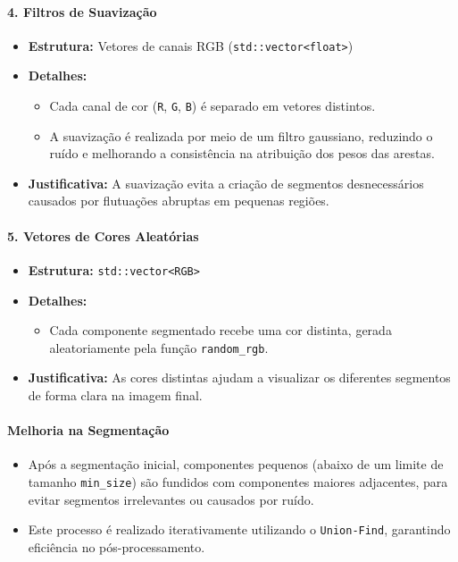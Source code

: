 \documentclass[12pt]{article}
\begin{document}
\paragraph*{\textbf{4. Filtros de Suavização}}
\begin{itemize}
    \item \textbf{Estrutura:} Vetores de canais RGB (\texttt{std::vector<float>})
    \item \textbf{Detalhes:}
    \begin{itemize}
        \item Cada canal de cor (\texttt{R}, \texttt{G}, \texttt{B}) é separado em vetores distintos.
        \item A suavização é realizada por meio de um filtro gaussiano, reduzindo o ruído e melhorando a consistência na atribuição dos pesos das arestas.
    \end{itemize}
    \item \textbf{Justificativa:} A suavização evita a criação de segmentos desnecessários causados por flutuações abruptas em pequenas regiões.
\end{itemize}

\paragraph*{\textbf{5. Vetores de Cores Aleatórias}}
\begin{itemize}
    \item \textbf{Estrutura:} \texttt{std::vector<RGB>}
    \item \textbf{Detalhes:}
    \begin{itemize}
        \item Cada componente segmentado recebe uma cor distinta, gerada aleatoriamente pela função \texttt{random\_rgb}.
    \end{itemize}
    \item \textbf{Justificativa:} As cores distintas ajudam a visualizar os diferentes segmentos de forma clara na imagem final.
\end{itemize}

\paragraph*{\textbf{Melhoria na Segmentação}}
\begin{itemize}
    \item Após a segmentação inicial, componentes pequenos (abaixo de um limite de tamanho \texttt{min\_size}) são fundidos com componentes maiores adjacentes, para evitar segmentos irrelevantes ou causados por ruído.
    \item Este processo é realizado iterativamente utilizando o \texttt{Union-Find}, garantindo eficiência no pós-processamento.
\end{itemize}
\end{document}
